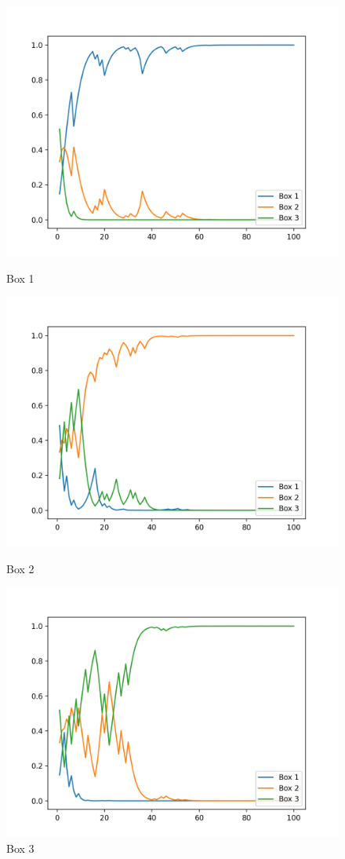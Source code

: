 \documentclass[12pt]{article}
\begin{document}
\begin{figure}[!htb]
  \includegraphics[width=\linewidth]{fig/fig_p25_1.png}
  \caption{Box 1}
\endminipage\hfill
{}
  \includegraphics[width=\linewidth]{fig/fig_p25_2.png}
  \caption{Box 2}
\endminipage\hfill
{}%
  \includegraphics[width=\linewidth]{fig/fig_p25_3.png}
  \caption{Box 3}
\endminipage
\end{figure}
\end{document}
